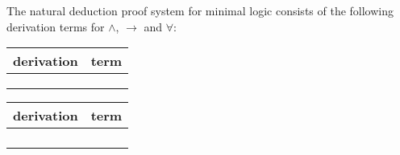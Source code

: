 \begin{mydef} 
The natural deduction proof system for minimal logic  consists of the following derivation terms for $\wedge$, $\to$ and $\forall$: 
\begin{center}

\begin{tabular}{| c | c |} \hline
derivation & term \\
\hline 
\raisebox{-1\height}{$u:A$} & \raisebox{-1\height}{$u^A$} \\ [3ex] \hline
\raisebox{-1.2\height}{
\AxiomC{$|M$}
\noLine
\UnaryInfC{$A$}
\AxiomC{$|N$}
\noLine
\UnaryInfC{$B $}
\RightLabel{$\wedge^+$}
\BinaryInfC{$A \wedge B$}
\DisplayProof} &  \raisebox{-2.8\height}{$\langle M^A, N^B \rangle^{A \wedge B}$} \\ [10ex]  \hline
\raisebox{-1.5\height}{
\AxiomC{$|M$}
\noLine
\UnaryInfC{$A \wedge B$}
\RightLabel{$\wedge^-_0$}
\UnaryInfC{$A$}
\DisplayProof \hspace{10pt}
\AxiomC{$|M$}
\noLine
\UnaryInfC{$A \wedge B$}
\RightLabel{$\wedge^-_1$}
\UnaryInfC{$A$}
\DisplayProof} & \raisebox{-2.8\height}{$(M^{A \wedge B} 0)^A \quad (M^{A \wedge B} 1)^B$} \\ [10ex] \hline


\end{tabular}
\end{center}

\begin{center}
\begin{tabular}{|c|c|} \hline

derivation & term \\ \hline

\raisebox{-1\height}{
\AxiomC{$\mathass{u: \,A}$}
\noLine
\UnaryInfC{$| \,M$}
\noLine
\UnaryInfC{$B$}
\RightLabel{$\to^+$}
\UnaryInfC{$A \to B$}
\DisplayProof} & \raisebox{-3.2\height}{$(\lambda u^AM^B)^{A \to B}$} \\ [12ex] \hline

\raisebox{-1\height}{
\AxiomC{$|M$}
\noLine
\UnaryInfC{$A \to B$}
\AxiomC{$|N$}
\noLine
\UnaryInfC{$A$}
\RightLabel{$\to^-$}
\BinaryInfC{$B$}
\DisplayProof} & \raisebox{-1.2\height}{$(M^{A \to B} N^{A})^B$} \\ [5ex] \hline



\raisebox{-1\height}{
\AxiomC{$|M$}
\noLine
\UnaryInfC{$A$}
\RightLabel{$\forall^+x \ (var.cond.)$}
\UnaryInfC{$\forall x A$}
\DisplayProof} & \raisebox{-2.8\height}{$(\lambda x M^A)^{\forall x A} \, (var.cond.)$}  \\ [10ex] \hline

\raisebox{-1\height}{
\AxiomC{$|M$}
\noLine
\UnaryInfC{$\forall x. A$}
\AxiomC{t}
\RightLabel{$\forall^-$}
\BinaryInfC{$A[x:=t]$}
\DisplayProof} & \raisebox{-2.8\height}{$(M^{\forall x A}t)^{A[x:=t]}$} \\ [10ex] \hline


\end{tabular}
\end{center}


\end{mydef}
